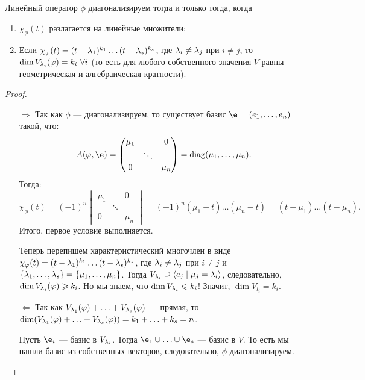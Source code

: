 \begin{Theorem}
Линейный оператор $\phi$ диагонализируем тогда и только тогда, когда 
\begin{enumerate}
\item $\chi_\phi(t)$ разлагается на линейные множители;
\item Если $\chi_\varphi(t) = (t - \lambda_1)^{k_1}\dots(t - \lambda_s)^{k_s}$, где $\lambda_i \neq \lambda_j$ при $i \neq j$, то $\dim V_{\lambda_i}(\varphi) = k_i \ \forall i$ (то есть для любого собственного значения $V$ равны геометрическая и алгебраическая кратности).
\end{enumerate}
\end{Theorem}

\begin{proof}\
\begin{itemize}
\item[$\Rightarrow$] Так как $\phi$ --- диагонализируем, то существует базис $\e = (e_1, \ldots, e_n)$ такой, что:
\begin{gather*}
A(\phi, \e) = 
\begin{pmatrix*}
\mu_1 & & 0 \\
& \ddots & \\
0 & & \mu_n
\end{pmatrix*} = \diag(\mu_1, \ldots, \mu_n).
\end{gather*}
Тогда:
$$
\chi_\phi(t) = (-1)^n 
\begin{vmatrix}
\mu_1 & & 0 \\
& \ddots & \\
0 & & \mu_n
\end{vmatrix} = (-1)^n(\mu_1 - t)\ldots(\mu_n - t) = (t - \mu_1)\ldots(t-\mu_n).
$$
Итого, первое условие выполняется.

Теперь перепишем характеристический многочлен в виде $\chi_\varphi(t) = (t - \lambda_1)^{k_1}\dots(t - \lambda_s)^{k_s}$, где $\lambda_i \neq \lambda_j$ при $i \neq j$ и $\{ \lambda_1, \ldots, \lambda_s \} = \{\mu_1, \ldots, \mu_n \}$. Тогда $V_{\lambda_i} \supseteq \langle e_j \mid \mu_j = \lambda_i \rangle$, следовательно, $\dim V_{\lambda_i}(\varphi) \geqslant k_i$. Но мы знаем, что $\dim V_{\lambda_i} \leqslant k_i$! Значит, $\dim V_{l_i} = k_i$.

\item[$\Leftarrow$] Так как $V_{\lambda_1}(\varphi) + \ldots + V_{\lambda_s}(\varphi)$ --- прямая, то $\dim (V_{\lambda_1}(\varphi) + \ldots + V_{\lambda_s}(\varphi)) = k_1 + \ldots + k_s = n$.

Пусть $\e_i$ --- базис в $V_{\lambda_i}$. Тогда $\e_1 \cup \ldots \cup \e_s$ --- базис в $V$. То есть мы нашли базис из собственных векторов, следовательно, $\phi$ диагонализируем.
\end{itemize}
\end{proof}

